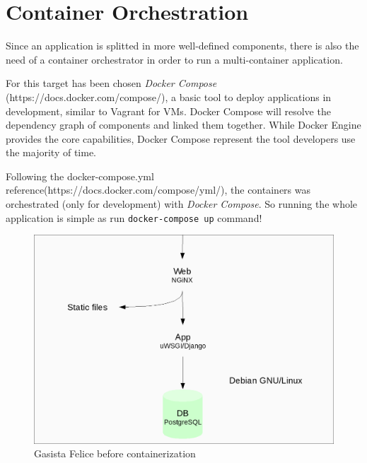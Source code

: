 \section{Container Orchestration}\label{container-orchestration}

Since an application is splitted in more well-defined components, there is also the need of a container orchestrator in order to run a multi-container application.

For this target has been chosen \textit{Docker Compose} (https://docs.docker.com/compose/), a basic tool to deploy applications in development, similar to Vagrant for VMs. Docker Compose will resolve the dependency graph of components and linked them together. While Docker Engine provides the core capabilities, Docker Compose represent the tool developers use the majority of time.

Following the docker-compose.yml reference(https://docs.docker.com/compose/yml/), the containers was orchestrated (only for development) with \textit{Docker Compose}. So running the whole application is simple as run \texttt{docker-compose up} command!

\begin{figure}[htbp]
\centering
\includegraphics{media/ch3-gf_old.png}
\caption{Gasista Felice before containerization}
\end{figure}

